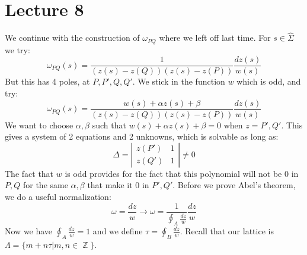 \documentclass[12 pt]{article}
\DeclareMathOperator {\Z} {\mathbb{Z}}
\theoremstyle{plain}
\theoremstyle{definition}
\theoremstyle{remark}
\begin{document}
\section*{Lecture 8}
We continue with the construction of $\omega_{PQ}$ where we left off last time. For $s\in \hat \Sigma$ we try:
\[     \omega_{PQ}(s) = \frac{1}{(z(s) - z(Q))(z(s) - z(P))} \frac{dz(s)}{w(s) }     \]
But this has 4 poles, at $P,P',Q,Q'$. We stick in the function $w$ which is odd, and try:
\[      \omega_{PQ}(s) = \frac{w(s) + \alpha z(s) + \beta}{(z(s) - z(Q))(z(s) - z(P))}  \frac{dz(s)}{w(s) }    \]
We want to choose $\alpha, \beta$ such that $w(s) + \alpha z(s) + \beta = 0$ when $z=P', Q'$. This gives a system of 2 equations and 2 unknowns, which is solvable as long as:
\[    \Delta = \left| \begin{array} {cc} z(P') & 1 \\ z(Q') & 1 \end{array}  \right|   \neq 0   \]
The fact that $w$ is odd provides for the fact that this polynomial will not be $0$ in $P , Q$ for the same $\alpha, \beta$ that make it $0$ in $P', Q'$. Before we prove Abel's theorem, we do a useful normalization:
\[       \omega = \frac{dz}{w} \to \omega = \frac{1}{\oint_A \frac{dz}{w}} \frac{dz}{w}     \]
Now we have $\oint_A \frac{dz}{w} = 1$ and we define $\tau = \oint_B \frac{dz}{w}$. Recall that our lattice is $\Lambda = \{ m + n \tau | m,n \in \Z\}$.
\end{document}
